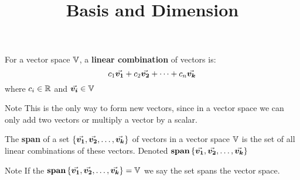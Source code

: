\documentclass{beamer}
\title[MATH 2250 - Section 3.6]{Basis and Dimension}
\begin{document}
\begin{frame}
  \titlepage
\end{frame}

\begin{frame}
\begin{definition}
For a vector space $\mathbb{V}$, a \textbf{linear combination} of vectors is:
\begin{equation*}
c_1{\vec{\boldsymbol{v_1}}}+c_2{\vec{\boldsymbol{v_2}}}+\cdots+c_n{\vec{\boldsymbol{v_k}}}
\end{equation*}
where $c_i\in\mathbb{R}$ and ${\vec{\boldsymbol{v_i}}}\in\mathbb{V}$
\end{definition}\pause
\begin{block}{Note}
This is the only way to form new vectors, since in a vector space we can only add two vectors or multiply a vector by a scalar.
\end{block}\pause
\begin{definition}
The \textbf{span} of a set $\left\{{\vec{\boldsymbol{v_1}}}, {\vec{\boldsymbol{v_2}}}, \ldots, {\vec{\boldsymbol{v_k}}}\right\}$ of vectors in a vector space $\mathbb{V}$ is the set of all linear combinations of these vectors. Denoted $\operatorname{\textbf{span}}\left\{{\vec{\boldsymbol{v_1}}}, {\vec{\boldsymbol{v_2}}}, \dots, {\vec{\boldsymbol{v_k}}}\right\}$
\end{definition}\pause
\begin{block}{Note}
If the $\operatorname{\textbf{span}}\left\{{\vec{\boldsymbol{v_1}}}, {\vec{\boldsymbol{v_2}}}, \dots, {\vec{\boldsymbol{v_k}}}\right\}=\mathbb{V}$ we say the set spans the vector space.
\end{block}
\end{frame}
\end{document}
